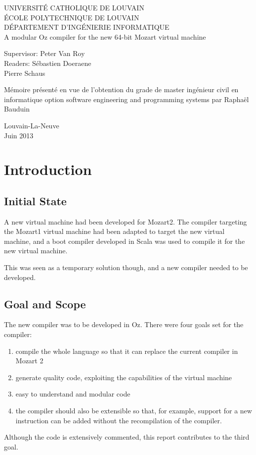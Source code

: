 \documentclass[a4paper]{memoir}
\newcommand*{\titleMS}{\begingroup%
{

\pagestyle{empty}
\centering 
{\LARGE UNIVERSITÉ CATHOLIQUE DE LOUVAIN}\\
{\LARGE ÉCOLE POLYTECHNIQUE DE LOUVAIN}\\
{\LARGE DÉPARTEMENT D'INGÉNIERIE INFORMATIQUE}\\[2\baselineskip]
\vspace{0.2\textheight}
{\LARGE A modular Oz compiler for the new 64-bit Mozart virtual machine}\par
\vspace{0.2\textheight}
\begin{minipage}[t]{0.45\textwidth}
  Supervisor: Peter Van Roy\\
  Readers: \hspace{3.9mm}S\'{e}bastien Doeraene\\
  \hspace*{18.5mm}Pierre Schaus
\end{minipage}
\hspace{3mm}
\begin{minipage}[t]{0.55\textwidth}
  M\'{e}moire pr\'{e}sent\'{e} en vue de l'obtention du grade de master ing\'{e}nieur civil en informatique option software engineering and programming systems par Raphaël Bauduin
\end{minipage}
\vspace*{2cm}
\begin{minipage}[t]{\textwidth}
\vspace*{4cm}
\centering 

Louvain-La-Neuve\\
Juin 2013
\end{minipage}
} %
\endgroup}
\begin{document}
\newcommand{\nav}[1]{#1}
\renewcommand{\topfraction}{.85}
\renewcommand{\bottomfraction}{.7}
\renewcommand{\textfraction}{.15}
\renewcommand{\floatpagefraction}{.66}
\renewcommand{\dbltopfraction}{.66}
\renewcommand{\dblfloatpagefraction}{.66}
\setcounter{topnumber}{9}
\setcounter{bottomnumber}{9}
\setcounter{totalnumber}{20}
\setcounter{dbltopnumber}{9}

\lstset{language=Oz,basicstyle=\ttfamily\small,columns=fullflexible,keepspaces=true,
escapechar=µ}

\ifdraftdoc
{}
\fi

%
\frontmatter


\begin{titlingpage}
\titleMS
\end{titlingpage}


\tableofcontents

\mainmatter
\chapter{Introduction}
\section{Initial State}
A new virtual machine had been developed for Mozart2. The compiler
targeting the Mozart1 virtual machine had been adapted to target the new
virtual machine, and a boot compiler developed in Scala was used to compile it
for the new virtual machine.

This was seen as a temporary solution though, and a new compiler needed
to be developed. 


\section{Goal and Scope}
The new compiler was to be developed in Oz.
There were four goals set for the compiler:
\begin{enumerate}
  \item compile the whole language so that it can replace the current compiler in Mozart 2
  \item generate quality code, exploiting the capabilities of the virtual machine
  \item easy to understand and modular code
  \item the compiler should also be extensible so that, for example, support for a new instruction can be added without the recompilation of the compiler.
\end{enumerate}
Although the code is extensively commented, this report contributes to the third goal.
\end{document}
